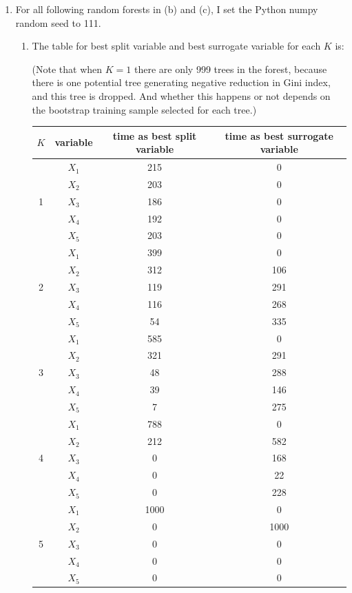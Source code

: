 \documentclass[paper=letter, fontsize=12pt]{article}
\begin{document}
\begin{enumerate}[label=(\alph*)]
	\item 
	For all following random forests in (b) and (c), I set the Python numpy random seed to 111.
	
	\begin{enumerate}[label=(\roman*)]
		\item The table for best split variable and best surrogate variable for each $K$ is:
		
		(Note that when $K = 1$ there are only 999 trees in the forest, because there is one potential tree generating negative reduction in Gini index, and this tree is dropped. And whether this happens or not depends on the bootstrap training sample selected for each tree.)
		
		\begin{center}
			\begin{longtable}{|c|c|c|c|}
				\hline
				$K$ & variable & time as best split variable  & time as best surrogate variable \\ \hline
				\multirow{5}{1em}{1} & $X_1$ & 215 & 0 \\ 
				& $X_2$ & 203 & 0\\
				& $X_3$ & 186 & 0\\
				& $X_4$ & 192 & 0\\
				& $X_5$ & 203 & 0\\
				\hline
				\multirow{5}{1em}{2} & $X_1$ & 399 & 0\\ 
				& $X_2$ & 312 & 106\\
				& $X_3$ & 119 & 291\\
				& $X_4$ & 116 & 268\\
				& $X_5$ & 54 & 335\\
				\hline
				\multirow{5}{1em}{3} & $X_1$ & 585 & 0 \\ 
				& $X_2$ & 321 & 291\\
				& $X_3$ & 48 & 288\\
				& $X_4$ & 39 & 146\\
				& $X_5$ & 7 & 275\\
				\hline
				\multirow{5}{1em}{4} & $X_1$ & 788 & 0\\ 
				& $X_2$ & 212 & 582\\
				& $X_3$ & 0 & 168\\
				& $X_4$ & 0 & 22\\
				& $X_5$ & 0 & 228\\
				\hline
				\multirow{5}{1em}{5} & $X_1$ & 1000 & 0\\ 
				& $X_2$ & 0 & 1000\\
				& $X_3$ & 0 & 0\\
				& $X_4$ & 0 & 0\\
				& $X_5$ & 0 & 0\\
				\hline
			\end{longtable}
		\end{center}	
	

\end{enumerate}
\end{enumerate}
\end{document}

